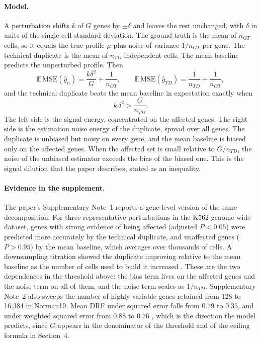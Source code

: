 \documentclass[11pt]{article}
\theoremstyle{definition}
\newcommand{\E}{\mathbb{E}}
\begin{document}
\paragraph{Model.} A perturbation shifts $k$ of $G$ genes by $\pm\delta$ and leaves the rest unchanged, with $\delta$ in units of the single-cell standard deviation. The ground truth is the mean of $n_{GT}$ cells, so it equals the true profile $\mu$ plus noise of variance $1/n_{GT}$ per gene. The technical duplicate is the mean of $n_{TD}$ independent cells. The mean baseline predicts the unperturbed profile. Then
\[
\E\,\mathrm{MSE}(\hat y_n)=\frac{k\delta^2}{G}+\frac1{n_{GT}},\qquad
\E\,\mathrm{MSE}(\hat y_{TD})=\frac1{n_{TD}}+\frac1{n_{GT}},
\]
and the technical duplicate beats the mean baseline in expectation exactly when
\[
k\,\delta^2>\frac{G}{n_{TD}}.
\]
The left side is the signal energy, concentrated on the affected genes. The right side is the estimation noise energy of the duplicate, spread over all genes. The duplicate is unbiased but noisy on every gene, and the mean baseline is biased only on the affected genes. When the affected set is small relative to $G/n_{TD}$, the noise of the unbiased estimator exceeds the bias of the biased one. This is the signal dilution that the paper describes, stated as an inequality.

\paragraph{Evidence in the supplement.} The paper's Supplementary Note~1 reports a gene-level version of the same decomposition. For three representative perturbations in the K562 genome-wide dataset, genes with strong evidence of being affected (adjusted $P<0.05$) were predicted more accurately by the technical duplicate, and unaffected genes ($P>0.95$) by the mean baseline, which averages over thousands of cells. A downsampling titration showed the duplicate improving relative to the mean baseline as the number of cells used to build it increased \citep{miller2026supp}. These are the two dependences in the threshold above: the bias term lives on the affected genes and the noise term on all of them, and the noise term scales as $1/n_{TD}$. Supplementary Note~2 also sweeps the number of highly variable genes retained from 128 to 16{,}384 in Norman19. Mean DRF under squared error falls from $0.79$ to $0.35$, and under weighted squared error from $0.88$ to $0.76$ \citep{miller2026supp}, which is the direction the model predicts, since $G$ appears in the denominator of the threshold and of the ceiling formula in Section~4.
\end{document}
